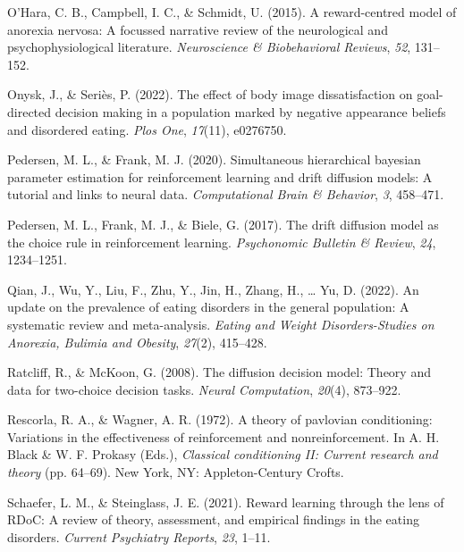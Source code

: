 \documentclass[
  man,floatsintext]{apa6}
\newlength{\cslhangindent}
\newlength{\cslentryspacingunit} %
\newenvironment{CSLReferences}[2] %
 {%
  \setlength{\parindent}{0pt}
  \ifodd #1
  \let\oldpar\par
  \def\par{\hangindent=\cslhangindent\oldpar}
  \fi
  \setlength{\parskip}{#2\cslentryspacingunit}
 }%
 {}
\begin{document}
\begin{CSLReferences}{1}{0}
\leavevmode{}%
O'Hara, C. B., Campbell, I. C., \& Schmidt, U. (2015). A reward-centred model of anorexia nervosa: A focussed narrative review of the neurological and psychophysiological literature. \emph{Neuroscience \& Biobehavioral Reviews}, \emph{52}, 131--152.

\leavevmode{}%
Onysk, J., \& Seriès, P. (2022). The effect of body image dissatisfaction on goal-directed decision making in a population marked by negative appearance beliefs and disordered eating. \emph{Plos One}, \emph{17}(11), e0276750.

\leavevmode{}%
Pedersen, M. L., \& Frank, M. J. (2020). Simultaneous hierarchical bayesian parameter estimation for reinforcement learning and drift diffusion models: A tutorial and links to neural data. \emph{Computational Brain \& Behavior}, \emph{3}, 458--471.

\leavevmode{}%
Pedersen, M. L., Frank, M. J., \& Biele, G. (2017). The drift diffusion model as the choice rule in reinforcement learning. \emph{Psychonomic Bulletin \& Review}, \emph{24}, 1234--1251.

\leavevmode{}%
Qian, J., Wu, Y., Liu, F., Zhu, Y., Jin, H., Zhang, H., \ldots{} Yu, D. (2022). An update on the prevalence of eating disorders in the general population: A systematic review and meta-analysis. \emph{Eating and Weight Disorders-Studies on Anorexia, Bulimia and Obesity}, \emph{27}(2), 415--428.

\leavevmode{}%
Ratcliff, R., \& McKoon, G. (2008). The diffusion decision model: Theory and data for two-choice decision tasks. \emph{Neural Computation}, \emph{20}(4), 873--922.

\leavevmode{}%
Rescorla, R. A., \& Wagner, A. R. (1972). A theory of pavlovian conditioning: Variations in the effectiveness of reinforcement and nonreinforcement. In A. H. Black \& W. F. Prokasy (Eds.), \emph{Classical conditioning II: Current research and theory} (pp. 64--69). New York, NY: Appleton-Century Crofts.

\leavevmode{}%
Schaefer, L. M., \& Steinglass, J. E. (2021). Reward learning through the lens of RDoC: A review of theory, assessment, and empirical findings in the eating disorders. \emph{Current Psychiatry Reports}, \emph{23}, 1--11.


\end{CSLReferences}
\end{document}
